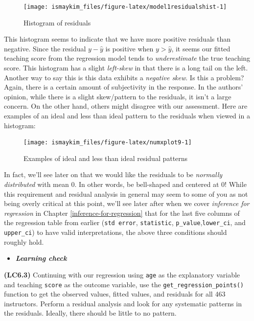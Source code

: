 \documentclass[12pt,]{krantz}
\newenvironment{rmdblock}[1]
  {\begin{shaded*}
  \begin{itemize}
  \renewcommand{\labelitemi}{
    \raisebox{-.7\height}[0pt][0pt]{
    }
  }
  \item
  }
  {
  \end{itemize}
  \end{shaded*}
  }
\newenvironment{learncheck}
  {\begin{rmdblock}{warning}}
  {\end{rmdblock}}
\theoremstyle{definition}
\theoremstyle{definition}
\theoremstyle{definition}
\theoremstyle{remark}
\begin{document}
\begin{figure}

{\centering \texttt{[image: ismaykim\_files/figure-latex/model1residualshist-1]} 

}

\caption{Histogram of residuals}\label{fig:model1residualshist}
\end{figure}

This histogram seems to indicate that we have more positive residuals
than negative. Since the residual \(y-\widehat{y}\) is positive when
\(y > \widehat{y}\), it seems our fitted teaching score from the
regression model tends to \emph{underestimate} the true teaching score.
This histogram has a slight \emph{left-skew} in that there is a long
tail on the left. Another way to say this is this data exhibits a
\emph{negative skew}. Is this a problem? Again, there is a certain
amount of subjectivity in the response. In the authors' opinion, while
there is a slight skew/pattern to the residuals, it isn't a large
concern. On the other hand, others might disagree with our assessment.
Here are examples of an ideal and less than ideal pattern to the
residuals when viewed in a histogram:

\begin{figure}

{\centering \texttt{[image: ismaykim\_files/figure-latex/numxplot9-1]} 

}

\caption{Examples of ideal and less than ideal residual patterns}\label{fig:numxplot9}
\end{figure}

In fact, we'll see later on that we would like the residuals to be
\emph{normally distributed} with mean 0. In other words, be bell-shaped
and centered at 0! While this requirement and residual analysis in
general may seem to some of you as not being overly critical at this
point, we'll see later after when we cover \emph{inference for
regression} in Chapter \ref{inference-for-regression} that for the last
five columns of the regression table from earlier (\texttt{std\ error},
\texttt{statistic}, \texttt{p\_value},\texttt{lower\_ci}, and
\texttt{upper\_ci}) to have valid interpretations, the above three
conditions should roughly hold.

\begin{learncheck}
\textbf{\emph{Learning check}}
\end{learncheck}

\textbf{(LC6.3)} Continuing with our regression using \texttt{age} as
the explanatory variable and teaching \texttt{score} as the outcome
variable, use the \texttt{get\_regression\_points()} function to get the
observed values, fitted values, and residuals for all 463 instructors.
Perform a residual analysis and look for any systematic patterns in the
residuals. Ideally, there should be little to no pattern.
\end{document}
